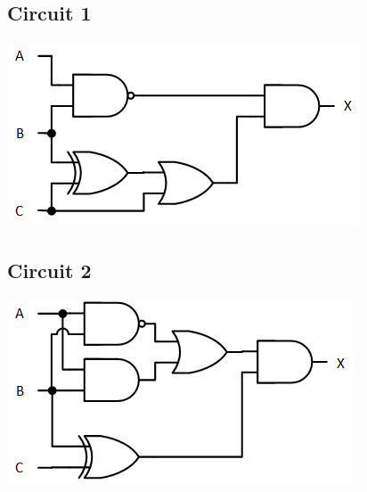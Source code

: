 \documentclass[11pt,a4paper]{article}
\begin{document}
\begin{center}
\begin{table}[ht!]
  \centering
  \begin{minipage}{0.50\textwidth}

\subsection*{Circuit 1}


\centerline{
\includegraphics[scale=1.45]{./img/logique_combinatoire/circuit_logique_1.png}
}

  \end{minipage}
  \hfillx
  \begin{minipage}{0.50\textwidth}

\subsection*{Circuit 2}


\centerline{
\includegraphics[scale=1.45]{./img/logique_combinatoire/circuit_logique_2.png}
}

  \end{minipage}
\end{table}
\end{center}

\vspace*{-1cm}
\end{document}
